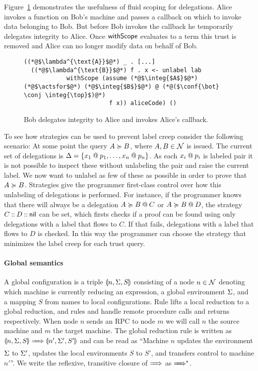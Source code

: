 Figure~\ref{fig:use-case-for-fluid-scope} demonstrates the usefulness of fluid scoping for delegations. Alice invokes a function on Bob's machine and passes a callback on which to invoke data belonging to Bob. But before Bob invokes the callback he temporarily delegates integrity to Alice. Once $\withscopekw$ evaluates to a term this trust is removed and Alice can no longer modify data on behalf of Bob.

\begin{figure}
\centering
\begin{lstlisting}
((*@$\lambda^{\text{A}}$@*) _ . [...]
  ((*@$\lambda^{\text{B}}$@*) f . x <- unlabel lab
            withScope (assume (*@$\integ{$A$}$@*) (*@$\actsfor$@*) (*@$\integ{$B$}$@*) @ (*@($\conf{\bot} \conj \integ{\top}$)@*)
                        f x)) aliceCode) ()
\end{lstlisting}
\caption{Bob delegates integrity to Alice and invokes Alice's callback.}
\label{fig:use-case-for-fluid-scope}
\end{figure}

To see how strategies can be used to prevent label creep consider the following scenario: At some point the query $A \actsfor B$, where $A, B \in \Nameset$ is issued. The current set of delegations is $\scope = \{ \lb{p_1}{x_1}, \dots, \lb{p_n}{x_n} \}$. As each $\lb{p_i}{x_i}$ is labeled pair it is not possible to inspect these without unlabeling the pair and raise the current label. We now want to unlabel as few of these as possible in order to prove that $A \actsfor B$. Strategies give the programmer first-class control over how this unlabeling of delegations is performed. For instance, if the programmer knows that there will always be a delegation $\lb{C}{A \actsfor B}$ or $\lb{D}{A \actsfor B}$, the strategy $\cons{C}{\cons{D}{\nil}}$ can be set, which firsts checks if a proof can be found using only delegations with a label that flows to $C$. If that fails, delegations with a label that flows to $D$ is checked. In this way the programmer can choose the strategy that minimizes the label creep for each trust query.

\paragraph{Global semantics}
A global configuration is a triple $\gconfig{n}{\env}{S}$ consisting of a node $n \in \Nameset$ denoting which machine is currently reducing an expression, a global environment $\env$, and a mapping $S$ from names to local configurations. Rule  lifts a local reduction to a global reduction, and rules  and  handle remote procedure calls and returns respectively. When node $n$ sends an RPC to node $m$ we will call $n$ the source machine and $m$ the target machine. The global reduction rule is written as $\gconfig{n}{\env}{S} \gstepsto \gconfig{n'}{\env'}{S'}$ and can be read as ``Machine $n$ updates the environment $\env$ to $\env'$, updates the local environments $S$ to $S'$, and transfers control to machine $n'$''. We write the reflexive, transitive closure of $\gstepsto$ as $\gstepstos$.

